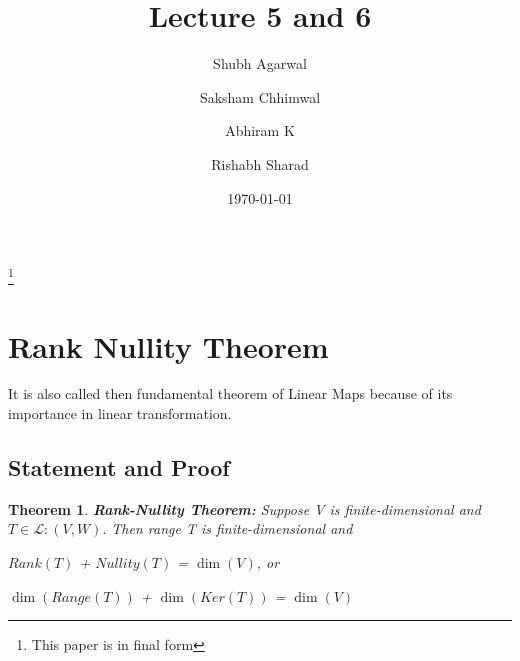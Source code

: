 \documentclass[a4paper,12pt,reqno,oneside]{amsart}
\newtheorem{theorem}{Theorem}
\theoremstyle{plain}
\numberwithin{equation}{section}
\begin{document}
\title[Rank Nullity Theorem and Matrix Representation]{Lecture 5 and 6}

\author{Shubh Agarwal}

 \author{Saksham Chhimwal}

 \author{Abhiram K}

\author{Rishabh Sharad}
%

\thanks{This paper is in final form}
\date{\today}
\maketitle

\section{Rank Nullity Theorem}
It is also called then fundamental theorem of Linear Maps because of its importance
in linear transformation.

\subsection{Statement and Proof}

\begin{theorem}
	\textbf{Rank-Nullity Theorem:}
	Suppose V is finite-dimensional and $T\in\mathcal{L}:(V, W).$ Then range T is 
	finite-dimensional and 
	\begin{center}
		$Rank(T)$ + $Nullity(T)$ = $\dim(V)$, or
	\end{center}
	\begin{center}
		$\dim(Range(T))$ + $\dim(Ker(T))$ = $\dim(V)$
	\end{center}
\end{theorem}
\end{document}
